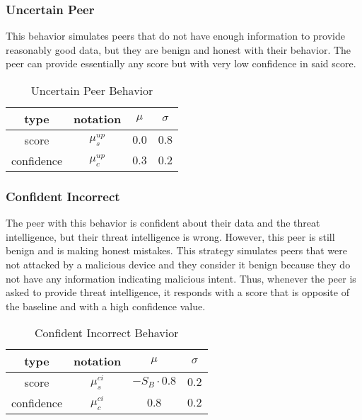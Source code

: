 \subsubsection{Uncertain Peer}
\label{subsubsec:uncertain-peer}
This behavior simulates peers that do not have enough information to provide reasonably good data, but they are benign and honest with their behavior.
The peer can provide essentially any score but with very low confidence in said score.

\begin{table}[!ht]
    \centering
    \begin{tabular}{c|c|c|c}
        type & notation & $\mu$ & $\sigma$ \\
        \hline
        score & $\mu^{up}_{s}$ & $0.0$ & $0.8$ \\
        confidence & $\mu^{up}_{c}$ &  $0.3$ & $0.2$ \\
    \end{tabular}
    \caption{Uncertain Peer Behavior}
    \label{tab:uncertain-peer}
\end{table}

\subsubsection{Confident Incorrect}
\label{subsubsec:confident-incorrect-peer}
The peer with this behavior is confident about their data and the threat intelligence, but their threat intelligence is wrong.
However, this peer is still benign and is making honest mistakes.
This strategy simulates peers that were not attacked by a malicious device and they consider it benign because they do not have any information indicating malicious intent.
Thus, whenever the peer is asked to provide threat intelligence, it responds with a score that is opposite of the baseline and with a high confidence value.

\begin{table}[!ht]
    \centering
    \begin{tabular}{c|c|c|c}
        type & notation & $\mu$ & $\sigma$ \\
        \hline
        score & $\mu^{ci}_{s}$ & $-S_{B} \cdot 0.8$ & $0.2$ \\
        confidence & $\mu^{ci}_{c}$ &  $0.8$ & $0.2$ \\
    \end{tabular}
    \caption{Confident Incorrect Behavior}
    \label{tab:confident-incorrect}
\end{table}


